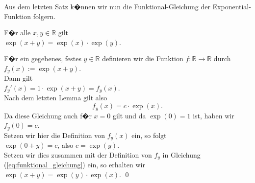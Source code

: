 Aus dem letzten Satz k�nnen wir nun die Funktional-Gleichung der Exponential-Funktion folgern.
\begin{Satz}
  F�r alle $x,y \in \mathbb{R}$ gilt 
  \\[0.2cm]
  \hspace*{1.3cm}
  $\exp(x + y) = \exp(x) \cdot \exp(y)$.  
\end{Satz}

\proof
F�r ein gegebenes, festes $y \in \mathbb{R}$ definieren wir die Funktion $f:\mathbb{R} \rightarrow \mathbb{R}$
durch  
\\[0.2cm]
\hspace*{1.3cm}
$f_y(x) := \exp(x + y)$.
\\[0.2cm]
Dann gilt 
\\[0.2cm]
\hspace*{1.3cm}
$f_y'(x) = 1 \cdot \exp(x + y) = f_y(x)$.
\\[0.2cm]
Nach dem letzten Lemma gilt also 
\begin{equation}
  \label{eq:funktional_gleichung}
  f_y(x) = c \cdot \exp(x).  
\end{equation}
Da diese Gleichung auch f�r $x=0$ gilt und da $\exp(0) = 1$ ist, haben wir
\\[0.2cm]
\hspace*{1.3cm}
$f_y(0) = c$.
\\[0.2cm]
Setzen wir hier die Definition von $f_y(x)$ ein, so folgt
\\[0.2cm]
\hspace*{1.3cm}
$\exp(0 + y) = c$, \quad also $c = \exp(y)$.
\\[0.2cm]
Setzen wir dies zusammen mit der Definition von $f_y$ in Gleichung (\ref{eq:funktional_gleichung}) ein,
so erhalten wir
\\[0.2cm]
\hspace*{1.3cm}
$\exp(x+y) = \exp(y) \cdot \exp(x)$. \qed
\vspace*{0.3cm}


